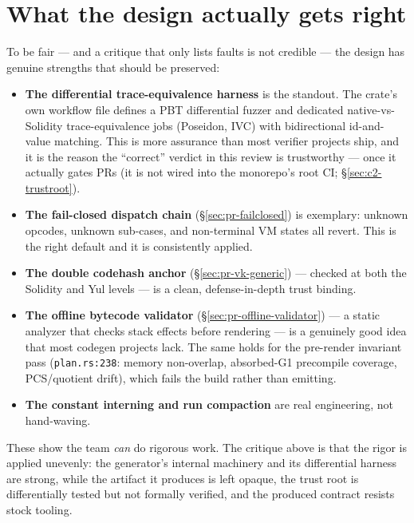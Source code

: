 \section{What the design actually gets right}
\label{sec:c-balance}

To be fair --- and a critique that only lists faults is not
credible --- the design has genuine strengths that should be
preserved:
\begin{itemize}[leftmargin=1.4em,itemsep=2pt]
\item \textbf{The differential trace-equivalence harness} is the
  standout. The crate's own workflow file defines a PBT differential
  fuzzer and dedicated native-vs-Solidity trace-equivalence jobs
  (Poseidon, IVC) with bidirectional id-and-value matching.
  This is more assurance than most verifier projects ship, and it
  is the reason the ``correct'' verdict in this review is
  trustworthy --- once it actually gates PRs (it is not wired into
  the monorepo's root CI; \S\ref{sec:c2-trustroot}).
\item \textbf{The fail-closed dispatch chain}
  (\S\ref{sec:pr-failclosed}) is exemplary: unknown opcodes,
  unknown sub-cases, and non-terminal VM states all revert. This
  is the right default and it is consistently applied.
\item \textbf{The double codehash anchor}
  (\S\ref{sec:pr-vk-generic}) --- checked at both the Solidity
  and Yul levels --- is a clean, defense-in-depth trust binding.
\item \textbf{The offline bytecode validator}
  (\S\ref{sec:pr-offline-validator}) --- a static analyzer that
  checks stack effects before rendering --- is a genuinely good
  idea that most codegen projects lack. The same holds for the
  pre-render invariant pass (\texttt{plan.rs:238}: memory
  non-overlap, absorbed-G1 precompile coverage, PCS/quotient
  drift), which fails the build rather than emitting.
\item \textbf{The constant interning and run compaction} are real
  engineering, not hand-waving.
\end{itemize}
These show the team \emph{can} do rigorous work. The critique
above is that the rigor is applied unevenly: the generator's
internal machinery and its differential harness are strong, while the
artifact it produces is left opaque, the trust root is
differentially tested but not formally verified, and the
produced contract resists stock tooling.

